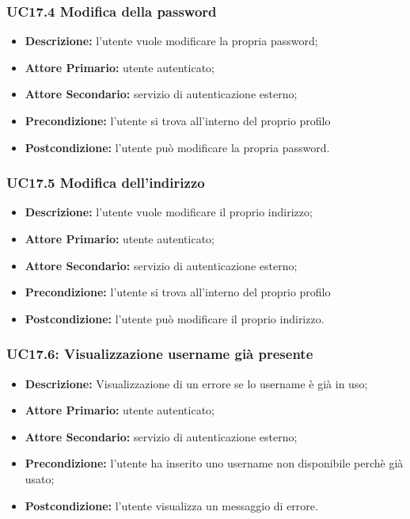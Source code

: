 \subsubsection{UC17.4 Modifica della password}
\label{sec:UC17.4}
\begin{itemize}
    \item \textbf{Descrizione:} l'utente vuole modificare la propria password;
    \item \textbf{Attore Primario:} utente autenticato;
    \item \textbf{Attore Secondario:} servizio di autenticazione esterno;
    \item \textbf{Precondizione:} l'utente si trova all'interno del proprio profilo
    \item \textbf{Postcondizione:} l'utente può modificare la propria password.
\end{itemize}

\subsubsection{UC17.5 Modifica dell'indirizzo}
\label{sec:UC17.5}
\begin{itemize}
    \item \textbf{Descrizione:} l'utente vuole modificare il proprio indirizzo;
    \item \textbf{Attore Primario:} utente autenticato;
    \item \textbf{Attore Secondario:} servizio di autenticazione esterno;
    \item \textbf{Precondizione:} l'utente si trova all'interno del proprio profilo
    \item \textbf{Postcondizione:} l'utente può modificare il proprio indirizzo.
\end{itemize}

\subsubsection{UC17.6: Visualizzazione username già presente}
\label{sec:UC17.6}
\begin{itemize}
    \item \textbf{Descrizione:} Visualizzazione di un errore se lo username è già in uso;
    \item \textbf{Attore Primario:} utente autenticato;
    \item \textbf{Attore Secondario:} servizio di autenticazione esterno;
    \item \textbf{Precondizione:} l'utente ha inserito uno username non disponibile perchè già usato;
    \item \textbf{Postcondizione:} l'utente visualizza un messaggio di errore.
\end{itemize}

